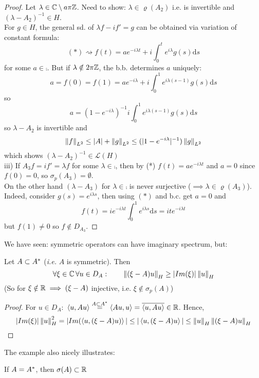\documentclass{article}
\begin{document}
\begin{example}
\begin{proof}
		Let $\lambda\in\mathbb{C}\setminus a\pi\mathbb{Z}$.
		Need to show: $\lambda\in\varrho(A_2)$ i.e.  is invertible and $(\lambda-A_2)^{-1}\in{H}$.\\
		For $g\in H$, the general sd. of $\lambda f-if'=g$ can be obtained via variation of constant formula:
		$$
			(*)\rightsquigarrow f(t)=ae^{-i\lambda t}+i \int_0^t e^{i\lambda}g(s)\mathrm{d}s
		$$
		for some $a\in\comp$. But if $\lambda\notin2\pi\mathbb{Z}$, the b.b. determines $a$ uniquely:
		$$
			a=f(0)=f(1)=ae^{-i\lambda}+i\int_0^1e^{i\lambda(s-1)}g(s)\mathrm{d}s$$
		so
		$$
			a=(1-e^{-i\lambda})^{-1}i\int_0^1e^{i\lambda(s-1)}g(s)\mathrm{d}s
		$$
		so $\lambda-A_2$ is invertible and
		$$
        \left\|{f}\right\|_{L^2}\leq |A|+\left\|{g}\right\|_{L^2}\leq(|1-e^{-i\lambda}|^{-1})\left\|{g}\right\|_{L^2}
        $$
		which shows $(\lambda-A_2)^{-1}\in\mathcal{L}(H)$\\
		iii) If $A_3f=if'=\lambda f$ for some $\lambda\in\comp$, then by (*) $f(t)=ae^{-i\lambda t}$ and $a=0$ since $f(0)=0$, so $\sigma_p(A_3)=\emptyset$.\\
		On the other hand $(\lambda-A_3)$ for $\lambda\in\comp$ is never surjective ($\implies \lambda\in\varrho(A_3)$). Indeed, consider $g(s)=e^{i\lambda s}$, then using $(*)$ and b.c. get $a=0$ and
		$$
        f(t)=ie^{-i\lambda t}\int_0^1e^{i\lambda s} \mathrm{d}s=ite^{-i\lambda t}
        $$
		but $f(1)\neq0$ so $f\notin D_{A_3}$.
	\end{proof}
\end{example}
We have seen: symmetric operators can have imaginary spectrum, but:
\begin{lemma}
\label{images of symmetric operators bounded below by imaginary part}

Let $A\subset {A}^*$ (\textit{i.e.} $A$ is symmetric). Then 
 $$
 \forall \xi \in \mathbb{C} \, \forall u\in D_A: \qquad  \left\|{(\xi-A)u}\right\|_H\geq |Im(\xi)|\left\|{u}\right\|_H
  $$
	(So for $\xi\notin\mathbb{R}\implies(\xi-A)$ injective, i.e. $\xi\notin\sigma_p(A)$)
\end{lemma}
\begin{proof}
		For $u\in D_A:$ $\left<{u},{Au}\right>\stackrel{A\subset{A}^*}{=}\left<{Au},{u}\right>=\overline{\left<{u},{Au}\right>}\in\mathbb{R}$. Hence,
		$$
			|Im(\xi)|\left\|{u}\right\|^2_H=|Im(\left<{u},{(\xi-A)u)}\right>|\leq|\left<{u},{(\xi-A)u}\right>|\leq\left\|{u}\right\|_H\left\|{(\xi-A)u}\right\|_H
		$$
\end{proof}
The example also nicely illustrates:
\begin{proposition}
\label{proposition: self adjoint operators have real spectrum}
	If $A={A}^*$, then $\sigma(A)\subset \mathbb{R}$
\end{proposition}
\end{document}
